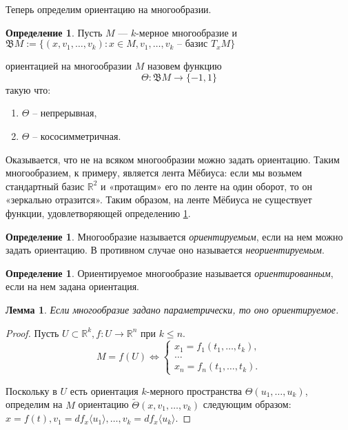 \documentclass[a5paper]{article}
\newcounter{through}
\theoremstyle{plain}
\newtheorem{lemma}[through]{Лемма}
\theoremstyle{definition}
\newtheorem{definition}[through]{Определение}
\numberwithin{through}{section}
\numberwithin{equation}{section}
\begin{document}
Теперь определим ориентацию на многообразии.
\begin{definition} \label{orient}
	Пусть $M$ --- $k$-мерное многообразие и
	$\mathfrak{B}M := \{ (x,v_1,\ldots,v_k): x \in M, v_1,\ldots,v_k \text{ -- базис } 
	T_x M\}$
\end{definition}
ориентацией на многообразии $M$ назовем функцию 
\[\Theta: \mathfrak{B}M \to \{-1,1\} \]
такую что:
\begin{enumerate}
	\item
	$\Theta$ -- непрерывная,
	
	\item
	$\Theta$ -- кососимметричная.
\end{enumerate}

Оказывается, что не на всяком многообразии можно задать ориентацию. 
Таким многообразием, к примеру, является лента Мёбиуса: 
если мы возьмем стандартный базис $\mathbb{R}^2$ и «протащим» 
его по ленте на один оборот, то он «зеркально отразится». 
Таким образом, на ленте Мёбиуса не существует функции, удовлетворяющей определению
\ref{orient}.

\begin{definition}
	Многообразие называется \textit{ориентируемым}, если на нем можно задать ориентацию.
	В противном случае оно называется \textit{неориентируемым}.
\end{definition}

\begin{definition}
	Ориентируемое многообразие называется \textit{ориентированным},
	если на нем задана ориентация.
\end{definition}

\begin{lemma}\label{OrientationParamEqTh}
	Если многообразие задано параметрически, то оно ориентируемое.
\end{lemma}

\begin{proof}
	Пусть $U \subset \mathbb{R}^k, f: U \to \mathbb{R}^n$ при $k \leq n$.
	\begin{equation*}
		M = f(U) \iff
		\begin{cases}
		x_1 = f_1(t_1,\ldots,t_k), \\
		\ldots \\
		x_n = f_n(t_1,\ldots, t_k).
		\end{cases}
	\end{equation*}
	
	Поскольку в $U$ есть ориентация $k$-мерного пространства $\Theta (u_1,\ldots,u_k)$,
	определим на $M$ ориентацию $\tilde{\Theta}(x,v_1,\ldots,v_k)$ следующим образом:
	$x = f(t), v_1 =df_x \langle u_1 \rangle, \ldots, v_k =  df_x \langle u_k \rangle$.
\end{proof}
\end{document}
